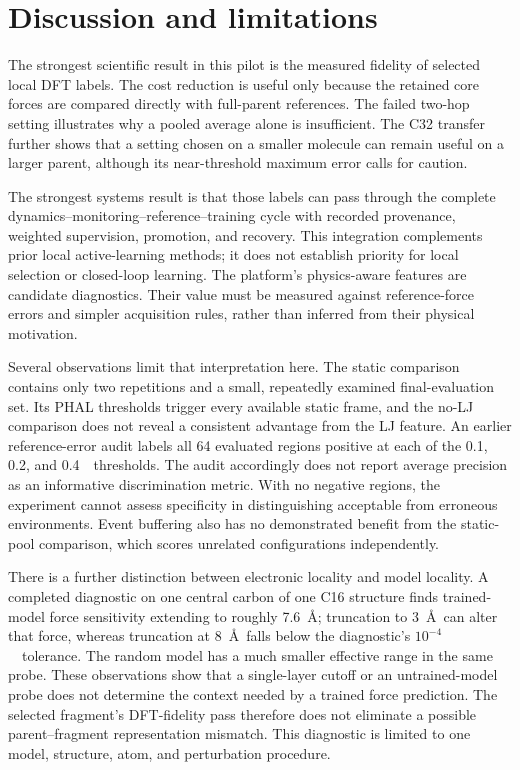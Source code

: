 \section{Discussion and limitations}
The strongest scientific result in this pilot is the measured fidelity
of selected local DFT labels. The cost reduction is useful only because
the retained core forces are compared directly with full-parent
references. The failed two-hop setting illustrates why a pooled average
alone is insufficient. The C32 transfer further shows that a setting
chosen on a smaller molecule can remain useful on a larger parent,
although its near-threshold maximum error calls for caution.

The strongest systems result is that those labels can pass through
the complete dynamics--monitoring--reference--training cycle with
recorded provenance, weighted supervision, promotion, and recovery.
This integration complements prior local active-learning methods;
it does not establish priority for local selection or closed-loop
learning. The platform's physics-aware features are candidate
diagnostics. Their value must be measured against reference-force
errors and simpler acquisition rules, rather than inferred from
their physical motivation.

Several observations limit that interpretation here. The static
comparison contains only two repetitions and a small, repeatedly
examined final-evaluation set. Its PHAL thresholds trigger every
available static frame, and the no-LJ comparison does not reveal
a consistent advantage from the LJ feature. An earlier reference-error
audit labels all 64 evaluated regions positive at each of the
0.1, 0.2, and 0.4~\forceunit\ thresholds. The audit accordingly
does not report average precision as an informative discrimination
metric. With no negative regions, the experiment cannot assess
specificity in distinguishing acceptable from erroneous environments.
Event buffering also has no demonstrated benefit from the static-pool
comparison, which scores unrelated configurations independently.

There is a further distinction between electronic locality and model
locality. A completed diagnostic on one central carbon of one C16
structure finds trained-model force sensitivity extending to roughly
7.6~\AA; truncation to 3~\AA\ can alter that force, whereas
truncation at 8~\AA\ falls below the diagnostic's
$10^{-4}$~\forceunit\ tolerance. The random model has a much smaller
effective range in the same probe. These observations show that a
single-layer cutoff or an untrained-model probe does not determine
the context needed by a trained force prediction. The selected
fragment's DFT-fidelity pass therefore does not eliminate a possible
parent--fragment representation mismatch. This diagnostic is limited
to one model, structure, atom, and perturbation procedure.

